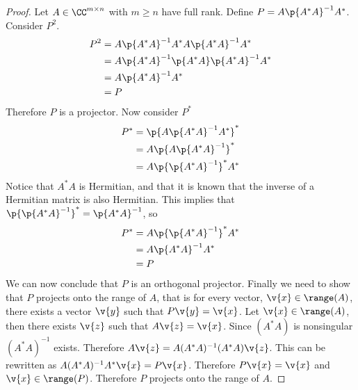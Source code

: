 \documentclass[11pt]{article}
\begin{document}
\begin{enumerate}
\begin{enumerate}
                \begin{proof}
                    Let $A \in \CC^{m \times n}$ with $m \ge n$ have full rank.
                    Define $P = A\p{A^* A}^{-1} A^*$.
                    Consider $P^2$.
                    \begin{align*}
                        P^2 &= A\p{A^* A}^{-1} A^* A\p{A^* A}^{-1} A^* \\
                            &= A\p{A^* A}^{-1} \p{A^* A} \p{A^* A}^{-1} A^* \\
                            &= A \p{A^* A}^{-1} A^* \\
                            &= P
                    \end{align*}
                    Therefore $P$ is a projector.
                    Now consider $P^*$
                    \begin{align*}
                        P^* &= \p{A \p{A^* A}^{-1} A^*}^* \\
                            &= A \p{A \p{A^* A}^{-1}}^* \\
                            &= A \p{\p{A^* A}^{-1}}^* A^* \\
                    \end{align*}
                    Notice that $A^* A$ is Hermitian, and that it is known that
                    the inverse of a Hermitian matrix is also Hermitian.
                    This implies that $\p{\p{A^* A}^{-1}}^* = \p{A^* A}^{-1}$, so
                    \begin{align*}
                        P^* &= A \p{\p{A^* A}^{-1}}^* A^* \\
                            &= A \p{A^* A}^{-1} A^* \\
                            &= P
                    \end{align*}
                    We can now conclude that $P$ is an orthogonal projector.
                    Finally we need to show that $P$ projects onto the range of
                    $A$, that is for every vector,  $\v{x} \in \range(A)$,
                    there exists a vector $\v{y}$ such that $P\v{y} = \v{x}$.
                    Let $\v{x} \in \range(A)$, then there exists $\v{z}$ such that
                    $A\v{z} = \v{x}$.
                    Since $(A^* A)$ is nonsingular $(A^* A)^{-1}$ exists.
                    Therefore $A\v{z} = A(A^* A)^{-1}(A^* A)\v{z}$.
                    This can be rewritten as $A(A^* A)^{-1}A^* \v{x} = P\v{x}$.
                    Therefore $P\v{x} = \v{x}$ and $\v{x} \in \range(P)$.
                    Therefore $P$ projects onto the range of $A$.
                \end{proof}
        \end{enumerate}


\end{enumerate}
\end{document}
